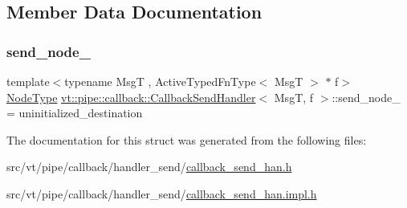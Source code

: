 \subsection{Member Data Documentation}
\mbox{\label{structvt_1_1pipe_1_1callback_1_1_callback_send_handler_a7c075ef051de92654dac6d4b291e60e2}} 
\subsubsection{\texorpdfstring{send\+\_\+node\+\_\+}{send\_node\_}}
{\footnotesize\ttfamily template$<$typename MsgT , Active\+Typed\+Fn\+Type$<$ Msg\+T $>$ $\ast$ f$>$ \\
\hyperlink{namespacevt_a866da9d0efc19c0a1ce79e9e492f47e2}{Node\+Type} \hyperlink{structvt_1_1pipe_1_1callback_1_1_callback_send_handler}{vt\+::pipe\+::callback\+::\+Callback\+Send\+Handler}$<$ MsgT, f $>$\+::send\+\_\+node\+\_\+ = uninitialized\+\_\+destination\hspace{0.3cm}{\ttfamily [private]}}



The documentation for this struct was generated from the following files\+:\begin{DoxyCompactItemize}
\item 
src/vt/pipe/callback/handler\+\_\+send/\hyperlink{callback__send__han_8h}{callback\+\_\+send\+\_\+han.\+h}\item 
src/vt/pipe/callback/handler\+\_\+send/\hyperlink{callback__send__han_8impl_8h}{callback\+\_\+send\+\_\+han.\+impl.\+h}\end{DoxyCompactItemize}
